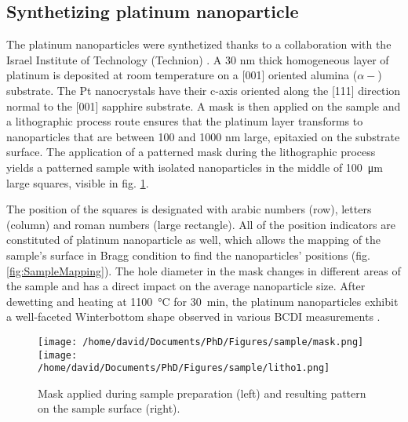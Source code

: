 \subsection{Synthetizing platinum nanoparticle}\label{sec:PtParticles}

The platinum nanoparticles were synthetized thanks to a collaboration with the Israel Institute of Technology (Technion) \parencite{Dupraz2017}.
A 30 nm thick homogeneous layer of platinum is deposited at room temperature on a [001] oriented alumina ($\alpha-$) substrate.
The Pt nanocrystals have their c-axis oriented along the [111] direction normal to the [001] sapphire substrate.
A mask is then applied on the sample and a lithographic process route ensures that the platinum layer transforms to nanoparticles that are between 100 and 1000 nm large, epitaxied on the substrate surface.
The application of a patterned mask during the lithographic process yields a patterned sample with isolated nanoparticles in the middle of \qty{100}{\um} large squares, visible in fig. \ref{fig:Mask}.

The position of the squares is designated with arabic numbers (row), letters (column) and roman numbers (large rectangle).
All of the position indicators are constituted of platinum nanoparticle as well, which allows the mapping of the sample's surface in Bragg condition to find the nanoparticles' positions (fig. \ref{fig:SampleMapping}).
The hole diameter in the mask changes in different areas of the sample and has a direct impact on the average nanoparticle size.
After dewetting and heating at \qty{1100}{\degreeCelsius} for \qty{30}{\minute}, the platinum nanoparticles exhibit a well-faceted Winterbottom shape observed in various BCDI measurements \parencite{Dupraz2017}.

\begin{figure}[!htb]
    \centering
    \texttt{[image: /home/david/Documents/PhD/Figures/sample/mask.png]}
    \texttt{[image: /home/david/Documents/PhD/Figures/sample/litho1.png]}
    \caption{
        Mask applied during sample preparation (left) and resulting pattern on the sample surface (right).
    }
    \label{fig:Mask}
\end{figure}

